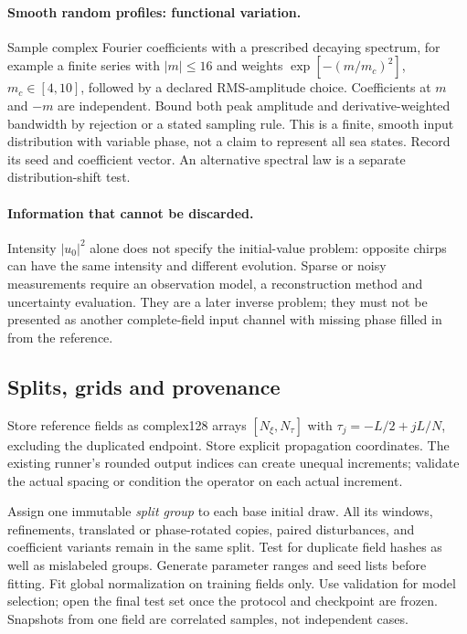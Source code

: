 \paragraph{Smooth random profiles: functional variation.}
Sample complex Fourier coefficients with a prescribed decaying spectrum,
for example a finite series with $|m|\leq16$ and weights
$\exp[-(m/m_c)^2]$, $m_c\in[4,10]$, followed by a declared RMS-amplitude
choice. Coefficients at $m$ and $-m$ are independent. Bound both peak
amplitude and derivative-weighted bandwidth by rejection or a stated
sampling rule. This is a finite, smooth input distribution with variable
phase, not a claim to represent all sea states. Record its seed and
coefficient vector. An alternative spectral law is a separate
distribution-shift test.

\paragraph{Information that cannot be discarded.}
Intensity $|u_0|^2$ alone does not specify the initial-value problem:
opposite chirps can have the same intensity and different evolution.
Sparse or noisy measurements require an observation model, a
reconstruction method and uncertainty evaluation. They are a later
inverse problem; they must not be presented as another complete-field
input channel with missing phase filled in from the reference.

\subsection{Splits, grids and provenance}
Store reference fields as complex128 arrays $[N_\xi,N_\tau]$ with
$\tau_j=-L/2+jL/N$, excluding the duplicated endpoint. Store explicit
propagation coordinates. The existing runner's rounded output indices
can create unequal increments; validate the actual spacing or condition
the operator on each actual increment.

Assign one immutable \emph{split group} to each base initial draw.
All its windows, refinements, translated or phase-rotated copies,
paired disturbances, and coefficient variants remain in the same split.
Test for duplicate field hashes as well as mislabeled groups.
Generate parameter ranges and seed lists before fitting. Fit global
normalization on training fields only. Use validation for model selection;
open the final test set once the protocol and checkpoint are frozen.
Snapshots from one field are correlated samples, not independent cases.


